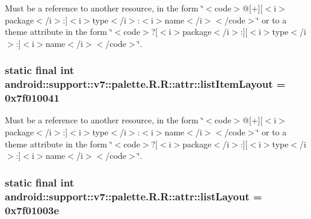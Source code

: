 Must be a reference to another resource, in the form \char`\"{}$<$code$>$@\mbox{[}+\mbox{]}\mbox{[}$<$i$>$package$<$/i$>$:\mbox{]}$<$i$>$type$<$/i$>$:$<$i$>$name$<$/i$>$$<$/code$>$\char`\"{} or to a theme attribute in the form \char`\"{}$<$code$>$?\mbox{[}$<$i$>$package$<$/i$>$:\mbox{]}\mbox{[}$<$i$>$type$<$/i$>$:\mbox{]}$<$i$>$name$<$/i$>$$<$/code$>$\char`\"{}. \hypertarget{classandroid_1_1support_1_1v7_1_1palette_1_1_r_1_1attr_9e18ac48a4c5a8ad40e3210ef96b2838}{
\subsubsection[{listItemLayout}]{\setlength{\rightskip}{0pt plus 5cm}static final int android::support::v7::palette.R.R::attr::listItemLayout = 0x7f010041}}
\label{classandroid_1_1support_1_1v7_1_1palette_1_1_r_1_1attr_9e18ac48a4c5a8ad40e3210ef96b2838}


Must be a reference to another resource, in the form \char`\"{}$<$code$>$@\mbox{[}+\mbox{]}\mbox{[}$<$i$>$package$<$/i$>$:\mbox{]}$<$i$>$type$<$/i$>$:$<$i$>$name$<$/i$>$$<$/code$>$\char`\"{} or to a theme attribute in the form \char`\"{}$<$code$>$?\mbox{[}$<$i$>$package$<$/i$>$:\mbox{]}\mbox{[}$<$i$>$type$<$/i$>$:\mbox{]}$<$i$>$name$<$/i$>$$<$/code$>$\char`\"{}. \hypertarget{classandroid_1_1support_1_1v7_1_1palette_1_1_r_1_1attr_c5258e91ba62b066b8e68f766cbf08c2}{
\subsubsection[{listLayout}]{\setlength{\rightskip}{0pt plus 5cm}static final int android::support::v7::palette.R.R::attr::listLayout = 0x7f01003e}}
\label{classandroid_1_1support_1_1v7_1_1palette_1_1_r_1_1attr_c5258e91ba62b066b8e68f766cbf08c2}


